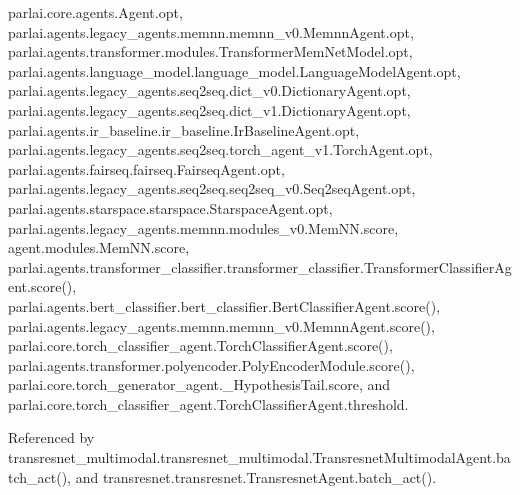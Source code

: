 parlai.\+core.\+agents.\+Agent.\+opt, parlai.\+agents.\+legacy\+\_\+agents.\+memnn.\+memnn\+\_\+v0.\+Memnn\+Agent.\+opt, parlai.\+agents.\+transformer.\+modules.\+Transformer\+Mem\+Net\+Model.\+opt, parlai.\+agents.\+language\+\_\+model.\+language\+\_\+model.\+Language\+Model\+Agent.\+opt, parlai.\+agents.\+legacy\+\_\+agents.\+seq2seq.\+dict\+\_\+v0.\+Dictionary\+Agent.\+opt, parlai.\+agents.\+legacy\+\_\+agents.\+seq2seq.\+dict\+\_\+v1.\+Dictionary\+Agent.\+opt, parlai.\+agents.\+ir\+\_\+baseline.\+ir\+\_\+baseline.\+Ir\+Baseline\+Agent.\+opt, parlai.\+agents.\+legacy\+\_\+agents.\+seq2seq.\+torch\+\_\+agent\+\_\+v1.\+Torch\+Agent.\+opt, parlai.\+agents.\+fairseq.\+fairseq.\+Fairseq\+Agent.\+opt, parlai.\+agents.\+legacy\+\_\+agents.\+seq2seq.\+seq2seq\+\_\+v0.\+Seq2seq\+Agent.\+opt, parlai.\+agents.\+starspace.\+starspace.\+Starspace\+Agent.\+opt, parlai.\+agents.\+legacy\+\_\+agents.\+memnn.\+modules\+\_\+v0.\+Mem\+N\+N.\+score, agent.\+modules.\+Mem\+N\+N.\+score, parlai.\+agents.\+transformer\+\_\+classifier.\+transformer\+\_\+classifier.\+Transformer\+Classifier\+Agent.\+score(), parlai.\+agents.\+bert\+\_\+classifier.\+bert\+\_\+classifier.\+Bert\+Classifier\+Agent.\+score(), parlai.\+agents.\+legacy\+\_\+agents.\+memnn.\+memnn\+\_\+v0.\+Memnn\+Agent.\+score(), parlai.\+core.\+torch\+\_\+classifier\+\_\+agent.\+Torch\+Classifier\+Agent.\+score(), parlai.\+agents.\+transformer.\+polyencoder.\+Poly\+Encoder\+Module.\+score(), parlai.\+core.\+torch\+\_\+generator\+\_\+agent.\+\_\+\+Hypothesis\+Tail.\+score, and parlai.\+core.\+torch\+\_\+classifier\+\_\+agent.\+Torch\+Classifier\+Agent.\+threshold.



Referenced by transresnet\+\_\+multimodal.\+transresnet\+\_\+multimodal.\+Transresnet\+Multimodal\+Agent.\+batch\+\_\+act(), and transresnet.\+transresnet.\+Transresnet\+Agent.\+batch\+\_\+act().

